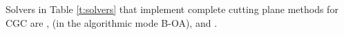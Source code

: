 Solvers in Table \ref{t:solvers} that implement complete cutting plane methods for CGC are \alphaecp, \bonmin (in the algorithmic mode B-OA), and \dicopt.


